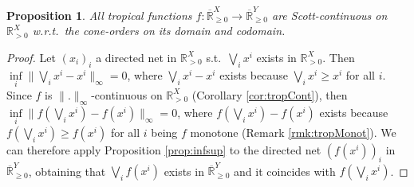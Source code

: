 \documentclass[submission,copyright,creativecommons]{eptcs}
\newtheorem{Proposition}[theorem]{Proposition}
\newtheorem{Remark}[theorem]{Remark}
\newcommand{\R}{\mathbb{R}}
\newcommand{\set}[1]{\{#1\}}
\newcommand{\supnorm}[1]{\lVert #1 \lVert_\infty}
\begin{document}


\begin{Proposition}
 All tropical functions $f:\overline{\R}^X_{\geq 0}\to\overline{\R}^Y_{\geq 0}$ are Scott-continuous on $\R^X_{> 0}$ w.r.t.\ the cone-orders on its domain and codomain.
\end{Proposition}
\begin{proof}
 Let $(x_i)_i$ a directed net in $\R^X_{> 0}$ s.t.\ $\bigvee\limits_i x^i$ exists in $\R^X_{> 0}$.
 Then $\inf\limits_i \supnorm{\bigvee\limits_i x^i - x^i} =0$, where $\bigvee\limits_i x^i - x^i$ exists because $\bigvee\limits_i x^i \geq x^i$ for all $i$.
 Since $f$ is $\supnorm{.}$-continuous on $\R^X_{> 0}$ (Corollary \ref{cor:tropCont}), then $\inf\limits_i \supnorm{f(\bigvee\limits_i x^i) - f(x^i)} =0$, where $f(\bigvee\limits_i x^i) - f(x^i)$ exists because $f(\bigvee\limits_i x^i) \geq f(x^i)$ for all $i$ being $f$ monotone (Remark \ref{rmk:tropMonot}).
 We can therefore apply Proposition \ref{prop:infsup} to the directed net $(f(x^i))_i$ in $\overline{\R}^Y_{\geq 0}$, obtaining that $\bigvee\limits_i f(x^i)$ exists in $\overline{\R}^Y_{\geq 0}$ and it coincides with $f(\bigvee\limits_i x^i)$.
\end{proof}

\end{document}
